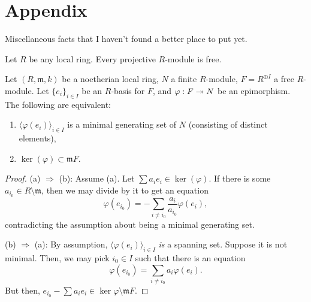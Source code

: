 \section{Appendix}

Miscellaneous facts that I haven't found a better place to put yet.

\begin{thm}
	Let $R$ be any local ring. Every projective $R$-module is free.
\end{thm}

\begin{prop} \label{prop:minimal-epimorphism}
	Let $(R, \mathfrak{m}, k)$ be a noetherian local ring, $N$ a finite $R$-module, $F = R^{\oplus I}$ a free $R$-module. Let $\{e_{i}\}_{i \in I}$ be an $R$-basis for $F$, and $\varphi : F \twoheadrightarrow N$ be an epimorphism. The following are equivalent:
	\begin{enumerate}[label=(\alph*)]
		\item $\langle \varphi(e_{i}) \rangle_{i \in I}$ is a minimal generating set of $N$ (consisting of distinct elements),
		\item $\ker(\varphi) \subset \mathfrak{m} F$.
	\end{enumerate}
\end{prop}
\begin{proof} 
	(a) $\Rightarrow$ (b): Assume (a). Let $\sum a_{i} e_{i} \in \ker(\varphi)$. If there is some $a_{i_{0}} \in R \setminus \mathfrak{m}$, then we may divide by it to get an equation
	\begin{equation*} 
		\varphi(e_{i_{0}}) = -\sum_{i \neq i_{0}} \frac{a_{i}}{a_{i_{0}}} \varphi(e_{i}),
	\end{equation*}
	contradicting the assumption about being a minimal generating set.

	(b) $\Rightarrow$ (a): By assumption, $\langle \varphi(e_{i}) \rangle_{i \in I}$ \emph{is} a spanning set. Suppose it is not minimal. Then, we may pick $i_{0} \in I$ such that there is an equation
	\begin{equation*} 
		\varphi(e_{i_{0}}) = \sum_{i \neq i_{0}} a_{i} \varphi(e_{i}).
	\end{equation*}
	But then, $e_{i_{0}} - \sum a_{i} e_{i} \in \ker \varphi \setminus \mathfrak{m} F$.
\end{proof}

